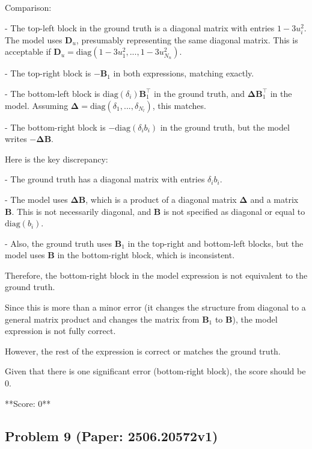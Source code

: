 \documentclass[10pt]{article}
\begin{document}
Comparison:

- The top-left block in the ground truth is a diagonal matrix with entries \(1 - 3u_i^2\). The model uses \(\boldsymbol{D}_u\), presumably representing the same diagonal matrix. This is acceptable if \(\boldsymbol{D}_u = \text{diag}(1-3u_1^2, ..., 1-3u_{N_n}^2)\).

- The top-right block is \(-\boldsymbol{B}_1\) in both expressions, matching exactly.

- The bottom-left block is \(\text{diag}(\delta_i) \boldsymbol{B}_1^\top\) in the ground truth, and \(\boldsymbol{\Delta} \boldsymbol{B}_1^\top\) in the model. Assuming \(\boldsymbol{\Delta} = \text{diag}(\delta_1, ..., \delta_{N_l})\), this matches.

- The bottom-right block is \(-\text{diag}(\delta_i b_i)\) in the ground truth, but the model writes \(-\boldsymbol{\Delta} \boldsymbol{B}\).

Here is the key discrepancy:

- The ground truth has a diagonal matrix with entries \(\delta_i b_i\).

- The model uses \(\boldsymbol{\Delta} \boldsymbol{B}\), which is a product of a diagonal matrix \(\boldsymbol{\Delta}\) and a matrix \(\boldsymbol{B}\). This is not necessarily diagonal, and \(\boldsymbol{B}\) is not specified as diagonal or equal to \(\text{diag}(b_i)\).

- Also, the ground truth uses \(\boldsymbol{B}_1\) in the top-right and bottom-left blocks, but the model uses \(\boldsymbol{B}\) in the bottom-right block, which is inconsistent.

Therefore, the bottom-right block in the model expression is not equivalent to the ground truth.

Since this is more than a minor error (it changes the structure from diagonal to a general matrix product and changes the matrix from \(\boldsymbol{B}_1\) to \(\boldsymbol{B}\)), the model expression is not fully correct.

However, the rest of the expression is correct or matches the ground truth.

Given that there is one significant error (bottom-right block), the score should be 0.

**Score: 0**

\newpage
\subsection*{Problem 9 (Paper: 2506.20572v1)}
\end{document}
